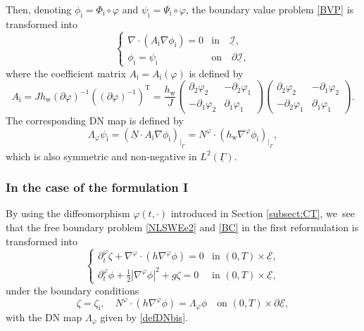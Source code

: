 \documentclass[JEP,XML,SOM,Unicode,NoFloatCountersInSection,published]{cedram}
\newcommand{\dt}{\partial_t}
\newcommand{\cI}{{\mathcal I}}
\newcommand{\cE}{{\mathcal E}}
\newcommand{\ul}[1]{\underline{#1}}
\newcommand{\itGamma}{\mathit{\Gamma}}
\theoremstyle{definition}
\begin{document}
Then, denoting $\phi_\mathrm{i}=\Phi_\mathrm{i}\circ \varphi$ and $\psi_\mathrm{i}=\Psi_\mathrm{i}\circ\varphi$, the boundary value problem \eqref{BVP} is transformed into
\begin{equation}\label{BVP2}
\begin{cases}
\nabla\cdot(A_\mathrm{i}\nabla\phi_\mathrm{i}) = 0 & \mbox{in} \quad \ul{\cI}, \\
\phi_\mathrm{i} = \psi_\mathrm{i} & \mbox{on} \quad \partial \ul{\cI},
\end{cases}
\end{equation}
where the coefficient matrix $A_\mathrm{i}=A_\mathrm{i}(\varphi)$ is defined by
\[
A_\mathrm{i} = J h_\mathrm{w} (\partial\varphi)^{-1}((\partial\varphi)^{-1})^\mathrm{T}
= \frac{h_\mathrm{w}}{J}
\begin{pmatrix}
\partial_2\varphi_2 & -\partial_2\varphi_1 \\
-\partial_1\varphi_2 & \partial_1\varphi_1
\end{pmatrix}
\begin{pmatrix}
\partial_2\varphi_2 & -\partial_1\varphi_2 \\
-\partial_2\varphi_1 & \partial_1\varphi_1
\end{pmatrix}.
\]
The corresponding DN map is defined by
\begin{equation}\label{defDNbis}
\Lambda_\varphi \psi_\mathrm{i} = (\ul{N}\cdot A_\mathrm{i}\nabla\phi_\mathrm{i})_{\vert_{\ul{\itGamma}}}
= N^\varphi \cdot (h_\mathrm{w} \nabla^\varphi \phi_\mathrm{i})_{\vert_{\ul{\itGamma}}},
\end{equation}
which is also symmetric and non-negative in $L^2(\ul{\itGamma})$.

\subsubsection{In the case of the formulation I}
By using the diffeomorphism $\varphi(t,\cdot)$ introduced in Section \ref{subsect:CT}, we~see that the free boundary problem \eqref{NLSWEe2} and \eqref{BC} in the first reformulation is transformed into
\begin{equation}\label{NLSWEe3}
\begin{cases}
\dt^\varphi \zeta + \nabla^\varphi \cdot (h\nabla^\varphi \phi) = 0 &\text{in } (0,T)\times\ul{\cE}, \\
\dt^\varphi \phi + \frac12|\nabla^\varphi \phi|^2 + g \zeta = 0 &\text{in } (0,T)\times\ul{\cE},
\end{cases}
\end{equation}
under the boundary conditions
\begin{equation}\label{BC2}
\zeta = \zeta_\mathrm{i}, \quad N^\varphi \cdot (h \nabla^\varphi \phi) = \Lambda_\varphi \phi \quad\text{on } (0,T)\times\partial \ul{\cE},
\end{equation}
with the DN map $\Lambda_\varphi$ given by \eqref{defDNbis}.
\end{document}
